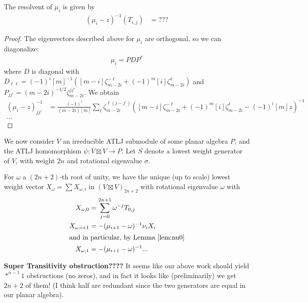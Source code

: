 \documentclass[12pt]{article}
\begin{document}
\begin{lem}
The resolvent of $\mu_i$ is given by
\begin{align*}
(\mu_i - z)^{-1}(T_{i,j}) & = ???
\end{align*}
\end{lem}
\begin{proof}
The eigenvectors described above for $\mu_i$ are orthogonal, so we can diagonalize:
\begin{align*}
\mu_i = P D P^*
\end{align*}
where $D$ is diagonal with 
$D_{\ell\ell} = (-1)^i [m]^{-1} \left([m-i] \zeta_{m-2i}^{-\ell} + (-1)^{m}[i] \zeta_{m-2i}^\ell\right)$ and
$P_{jj'} = (m-2i)^{-1/2} \zeta_{m-2i}^{jj'}$.
We obtain
\begin{align*}
(\mu_i - z)^{-1}_{jj'} & = \frac{(-1)^i}{(m-2i)[m]} \sum_{\ell} \zeta_{m-2i}^{\ell(j-j')}  \left([m-i] \zeta_{m-2i}^{-\ell} + (-1)^{m}[i] \zeta_{m-2i}^\ell - (-1)^i [m] z\right)^{-1} \\
...
\end{align*}
\end{proof}

We now consider $V$ an irreducible ATLJ submodule of some planar algebra $P$, and the ATLJ homomorphism $\psi: V\boxtimes V\rightarrow P$. Let $S$ denote a lowest weight generator of $V$, with weight $2n$ and rotational eigenvalue $\sigma$.

For $\omega$ a $(2n+2)$-th root of unity, we have the unique (up to scale) lowest weight vector $X_\omega = \sum X_{\omega,i}$ in $(V \boxtimes V)_{2n+2}$ with rotational eigenvalue $\omega$ with
\begin{align*}
X_{\omega,0} & = \sum_{j=0}^{2n+1} \omega^{-j} T_{0,j} \\
X_{\omega,i+1} & = - (\mu_{i+1} - \omega)^{-1} \nu_i X_i \\
\intertext{and in particular, by Lemma \ref{lem:nu0}}
X_{\omega,1} & = - (\mu_{i+1} - \omega)^{-1}  ...
\end{align*}

\textbf{Super Transitivity obstruction????} It seems like our above work should yield $*^{n-1}1$ obstructions (no zeros), and in fact it looks like (preliminarily) we get $2n+2$ of them! (I think half are redundant since the two generators are equal in our planar algebra).
\end{document}
